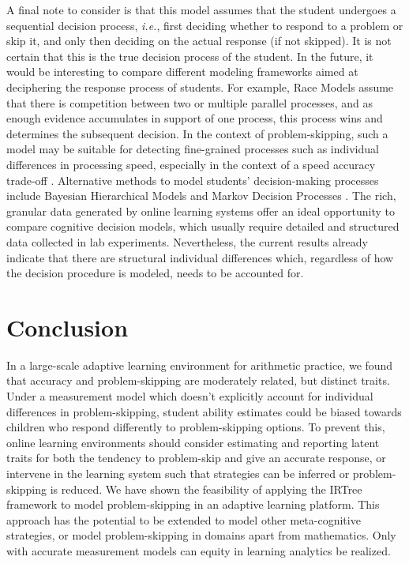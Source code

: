 \documentclass[12pt]{article}
\begin{document}
A final note to consider is that this model assumes that the student undergoes a sequential decision process, \textit{i.e.}, first deciding whether to respond to a problem or skip it, and only then deciding on the actual response (if not skipped). It is not certain that this is the true decision process of the student. In the future, it would be interesting to compare different modeling frameworks aimed at deciphering the response process of students. For example, Race Models \parencite{heathcote2022winner} assume that there is competition between two or multiple parallel processes, and as enough evidence accumulates in support of one process, this process wins and determines the subsequent decision. In the context of problem-skipping, such a model may be suitable for detecting fine-grained processes such as individual differences in processing speed, especially in the context of a speed accuracy trade-off \parencite{heathcote2022winner, evans2018modeling}. Alternative methods to model students' decision-making processes include Bayesian Hierarchical Models \parencite{sawyer2018modeling, lee2014bayesian} and Markov Decision Processes \parencite{lamar2018markov, puterman1994markov}. The rich, granular data generated by online learning systems offer an ideal opportunity to compare cognitive decision models, which usually require detailed and structured data collected in lab experiments. Nevertheless, the current results already indicate that there are structural individual differences which, regardless of how the decision procedure is modeled, needs to be accounted for.

\section{Conclusion}
In a large-scale adaptive learning environment for arithmetic practice, we found that accuracy and problem-skipping are moderately related, but distinct traits. Under a measurement model which doesn't explicitly account for individual differences in problem-skipping, student ability estimates could be biased towards children who respond differently to problem-skipping options. To prevent this, online learning environments should consider estimating and reporting latent traits for both the tendency to problem-skip and give an accurate response, or intervene in the learning system such that strategies can be inferred or problem-skipping is reduced. We have shown the feasibility of applying the IRTree framework \parencite{de2012irtrees} to model problem-skipping in an adaptive learning platform. This approach has the potential to be extended to model other meta-cognitive strategies, or model problem-skipping in domains apart from mathematics. Only with accurate measurement models can equity in learning analytics be realized. 
\end{document}
